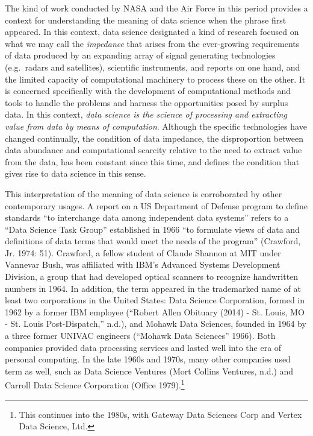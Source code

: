 \documentclass[
  letterpaper,
]{report}
\begin{document}
The kind of work conducted by NASA and the Air Force in this period
provides a context for understanding the meaning of data science when
the phrase first appeared. In this context, data science designated a
kind of research focused on what we may call the \emph{impedance} that
arises from the ever-growing requirements of data produced by an
expanding array of signal generating technologies (e.g.~radars and
satellites), scientific instruments, and reports on one hand, and the
limited capacity of computational machinery to process these on the
other. It is concerned specifically with the development of
computational methods and tools to handle the problems and harness the
opportunities posed by surplus data. In this context, \emph{data science
is the science of processing and extracting value from data by means of
computation}. Although the specific technologies have changed
continually, the condition of data impedance, the disproportion between
data abundance and computational scarcity relative to the need to
extract value from the data, has been constant since this time, and
defines the condition that gives rise to data science in this sense.

This interpretation of the meaning of data science is corroborated by
other contemporary usages. A report on a US Department of Defense
program to define standards ``to interchange data among independent data
systems'' refers to a ``Data Science Task Group'' established in 1966
``to formulate views of data and definitions of data terms that would
meet the needs of the program'' (Crawford, Jr. 1974: 51). Crawford, a
fellow student of Claude Shannon at MIT under Vannevar Bush, was
affiliated with IBM's Advanced Systems Development Division, a group
that had developed optical scanners to recognize handwritten numbers in
1964. In addition, the term appeared in the trademarked name of at least
two corporations in the United States: Data Science Corporation, formed
in 1962 by a former IBM employee ({``Robert Allen Obituary (2014) - St.
Louis, MO - St. Louis Post-Dispatch,''} n.d.), and Mohawk Data Sciences,
founded in 1964 by a three former UNIVAC engineers ({``Mohawk Data
Sciences''} 1966). Both companies provided data processing services and
lasted well into the era of personal computing. In the late 1960s and
1970s, many other companies used term as well, such as Data Science
Ventures (Mort Collins Ventures, n.d.) and Carroll Data Science
Corporation (Office 1979).\footnote{This continues into the 1980s, with
  Gateway Data Sciences Corp and Vertex Data Science, Ltd.}
\end{document}
